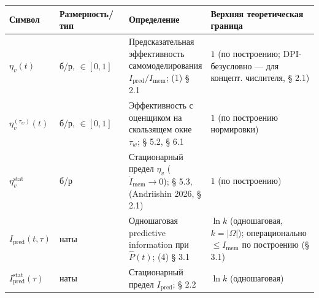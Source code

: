 \documentclass[pdflatex,sn-mathphys-ay]{sn-jnl}
\begin{document}
\begin{center}\small
\begin{tabular}{@{} >{\raggedright\arraybackslash}p{0.1159\linewidth} >{\raggedright\arraybackslash}p{0.2464\linewidth} >{\raggedright\arraybackslash}p{0.1884\linewidth} >{\raggedright\arraybackslash}p{0.4493\linewidth}@{}}
\toprule

\begin{minipage}[b]{\linewidth}\raggedright

Символ

\end{minipage} & \begin{minipage}[b]{\linewidth}\raggedright

Размерность/тип

\end{minipage} & \begin{minipage}[b]{\linewidth}\raggedright

Определение

\end{minipage} & \begin{minipage}[b]{\linewidth}\raggedright

Верхняя теоретическая граница

\end{minipage} \\

\midrule

\(\eta_v(t)\) & б/р, \(\in [0, 1]\) & Предсказательная эффективность самомоделирования \(I_{\text{pred}}/I_{\text{mem}}\); (1) § 2.1 & \(1\) (по построению; DPI-безусловно --- для концепт. числителя, § 2.1) \\

\(\eta_v^{(\tau_w)}(t)\) & б/р, \(\in [0, 1]\) & Эффективность с оценщиком на скользящем окне \(\tau_w\); § 5.2, § 6.1 & \(1\) (по построению нормировки) \\

\(\eta_v^{\text{stat}}\) & б/р & Стационарный предел \(\eta_v\) (\(\dot I_{\text{mem}} \to 0\)); § 5.3, (Andriishin 2026, § 2.1) & \(1\) (по построению) \\

\(I_{\text{pred}}(t, \tau)\) & наты & Одношаговая predictive information при \(\hat P(t)\); (4) § 3.1 & \(\ln k\) (одношаговая, \(k = \lvert\Omega\rvert\)); операционально \(\le I_{\text{mem}}\) по построению (§ 3.1) \\

\(I_{\text{pred}}^{\text{stat}}(\tau)\) & наты & Стационарный предел \(I_{\text{pred}}\); § 2.2 & \(\ln k\) (одношаговая) \\


\end{tabular}
\end{center}
\end{document}
